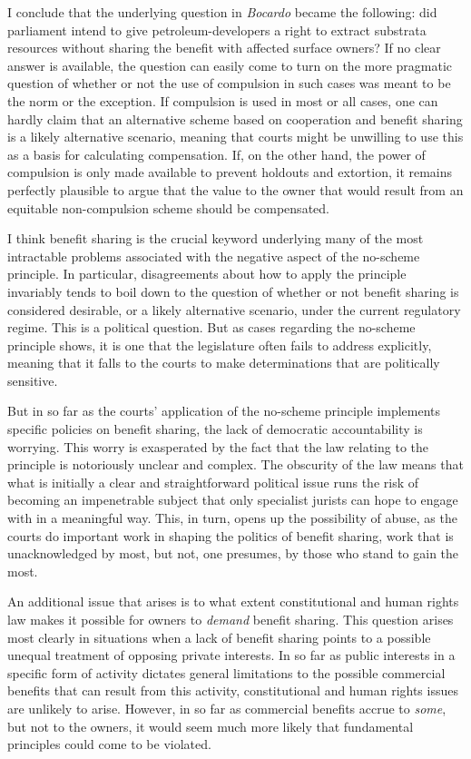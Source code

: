 I conclude that the underlying question in {\it Bocardo} became the following: did parliament intend to give petroleum-developers a right to extract substrata resources without sharing the benefit with affected surface owners? If no clear answer is available, the question can easily come to turn on the more pragmatic question of whether or not the use of compulsion in such cases was meant to be the norm or the exception. If compulsion is used in most or all cases, one can hardly claim that an alternative scheme based on cooperation and benefit sharing is a likely alternative scenario, meaning that courts might be unwilling to use this as a basis for calculating compensation. If, on the other hand, the power of compulsion is only made available to prevent holdouts and extortion, it remains perfectly plausible to argue that the value to the owner that would result from an equitable non-compulsion scheme should be compensated.

I think benefit sharing is the crucial keyword underlying many of the most intractable problems associated with the negative aspect of the no-scheme principle. In particular, disagreements about how to apply the principle invariably tends to boil down to the question of whether or not benefit sharing is considered desirable, or a likely alternative scenario, under the current regulatory regime. This is a political question. But as cases regarding the no-scheme principle shows, it is one that the legislature often fails to address explicitly, meaning that it falls to the courts to make determinations that are politically sensitive. 

But in so far as the courts' application of the no-scheme principle implements specific policies on benefit sharing, the lack of democratic accountability is worrying. This worry is exasperated by the fact that the law relating to the principle is notoriously unclear and complex. The obscurity of the law means that what is initially a clear and straightforward political issue runs the risk of becoming an impenetrable subject that only specialist jurists can hope to engage with in a meaningful way. This, in turn, opens up the possibility of abuse, as the courts do important work in shaping the politics of benefit sharing, work that is unacknowledged by most, but not, one presumes, by those who stand to gain the most.

An additional issue that arises is to what extent constitutional and human rights law makes it possible for owners to {\it demand} benefit sharing. This question arises most clearly in situations when a lack of benefit sharing points to a possible unequal treatment of opposing private interests. In so far as public interests in a specific form of activity dictates general limitations to the possible commercial benefits that can result from this activity, constitutional and human rights issues are unlikely to arise. However, in so far as commercial benefits accrue to {\it some}, but not to the owners, it would seem much more likely that fundamental principles could come to be violated.

